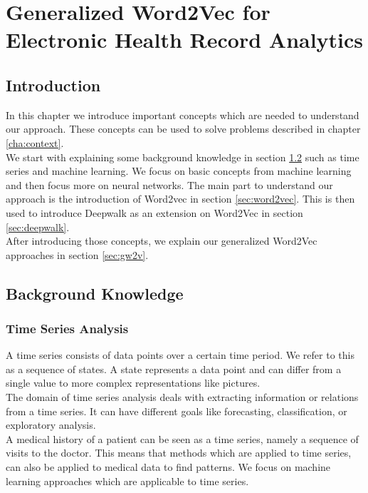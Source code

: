\graphicspath{ {Background/Images/} }


\chapter{Generalized Word2Vec for Electronic Health Record Analytics}
\label{cha:background}

\section{Introduction}
In this chapter we introduce important concepts which are needed to understand our approach. These concepts can be used to solve problems described in chapter \ref{cha:context}. \\

We start with explaining some background knowledge in section \ref{sec:bk} such as time series and machine learning. We focus on basic concepts from machine learning and then focus more on neural networks. The main part to understand our approach is the introduction of Word2vec in section \ref{sec:word2vec}. This is then used to introduce Deepwalk as an extension on Word2Vec in section \ref{sec:deepwalk}. \\

After introducing those concepts, we explain our generalized Word2Vec approaches in section \ref{sec:gw2v}.


\section{Background Knowledge}
\label{sec:bk}

	\subsection{Time Series Analysis}
A time series consists of data points over a certain time period. We refer to this as a sequence of states. A state represents a data point and can differ from a single value to more complex representations like pictures. \\
The domain of time series analysis deals with extracting information or relations from a time series. It can have different goals like forecasting, classification, or exploratory analysis. \\

A medical history of a patient can be seen as a time series, namely a sequence of visits to the doctor. This means that methods which are applied to time series, can also be applied to medical data to find patterns. We focus on machine learning approaches which are applicable to time series.

